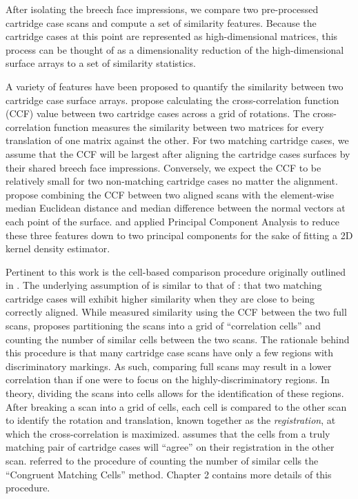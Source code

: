 \documentclass[11pt,]{isuthesis}
\begin{document}
After isolating the breech face impressions, we compare two pre-processed cartridge case scans and compute a set of similarity features.
Because the cartridge cases at this point are represented as high-dimensional matrices, this process can be thought of as a dimensionality reduction of the high-dimensional surface arrays to a set of similarity statistics.

A variety of features have been proposed to quantify the similarity between two cartridge case surface arrays.
\citet{tai_fully_2018} propose calculating the cross-correlation function (CCF) value between two cartridge cases across a grid of rotations.
The cross-correlation function measures the similarity between two matrices for every translation of one matrix against the other.
For two matching cartridge cases, we assume that the CCF will be largest after aligning the cartridge cases surfaces by their shared breech face impressions.
Conversely, we expect the CCF to be relatively small for two non-matching cartridge cases no matter the alignment.
\citet{Riva2014} propose combining the CCF between two aligned scans with the element-wise median Euclidean distance and median difference between the normal vectors at each point of the surface.
\citet{Riva2016} and \citet{Riva2020} applied Principal Component Analysis to reduce these three features down to two principal components for the sake of fitting a 2D kernel density estimator.

Pertinent to this work is the cell-based comparison procedure originally outlined in \citet{song_proposed_2013}.
The underlying assumption of \citet{song_proposed_2013} is similar to that of \citet{tai_fully_2018}: that two matching cartridge cases will exhibit higher similarity when they are close to being correctly aligned.
While \citet{tai_fully_2018} measured similarity using the CCF between the two full scans, \citet{song_proposed_2013} proposes partitioning the scans into a grid of ``correlation cells'' and counting the number of similar cells between the two scans.
The rationale behind this procedure is that many cartridge case scans have only a few regions with discriminatory markings.
As such, comparing full scans may result in a lower correlation than if one were to focus on the highly-discriminatory regions.
In theory, dividing the scans into cells allows for the identification of these regions.
After breaking a scan into a grid of cells, each cell is compared to the other scan to identify the rotation and translation, known together as the \emph{registration}, at which the cross-correlation is maximized.
\citet{song_proposed_2013} assumes that the cells from a truly matching pair of cartridge cases will ``agree'' on their registration in the other scan.
\citet{song_proposed_2013} referred to the procedure of counting the number of similar cells the ``Congruent Matching Cells'' method.
Chapter 2 contains more details of this procedure.
\end{document}
